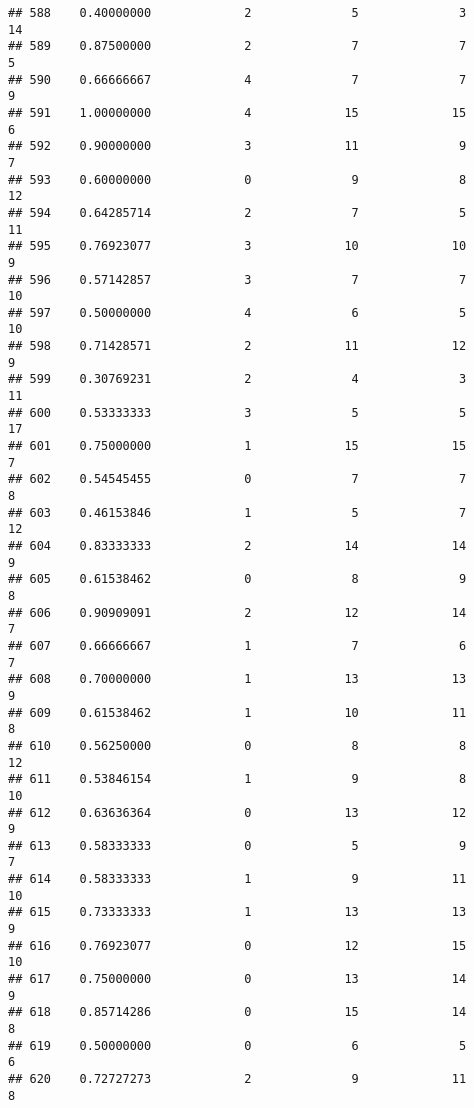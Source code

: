 \documentclass[
]{article}
\begin{document}
\begin{verbatim}
## 588    0.40000000             2              5              3             14
## 589    0.87500000             2              7              7              5
## 590    0.66666667             4              7              7              9
## 591    1.00000000             4             15             15              6
## 592    0.90000000             3             11              9              7
## 593    0.60000000             0              9              8             12
## 594    0.64285714             2              7              5             11
## 595    0.76923077             3             10             10              9
## 596    0.57142857             3              7              7             10
## 597    0.50000000             4              6              5             10
## 598    0.71428571             2             11             12              9
## 599    0.30769231             2              4              3             11
## 600    0.53333333             3              5              5             17
## 601    0.75000000             1             15             15              7
## 602    0.54545455             0              7              7              8
## 603    0.46153846             1              5              7             12
## 604    0.83333333             2             14             14              9
## 605    0.61538462             0              8              9              8
## 606    0.90909091             2             12             14              7
## 607    0.66666667             1              7              6              7
## 608    0.70000000             1             13             13              9
## 609    0.61538462             1             10             11              8
## 610    0.56250000             0              8              8             12
## 611    0.53846154             1              9              8             10
## 612    0.63636364             0             13             12              9
## 613    0.58333333             0              5              9              7
## 614    0.58333333             1              9             11             10
## 615    0.73333333             1             13             13              9
## 616    0.76923077             0             12             15             10
## 617    0.75000000             0             13             14              9
## 618    0.85714286             0             15             14              8
## 619    0.50000000             0              6              5              6
## 620    0.72727273             2              9             11              8

\end{verbatim}
\end{document}
